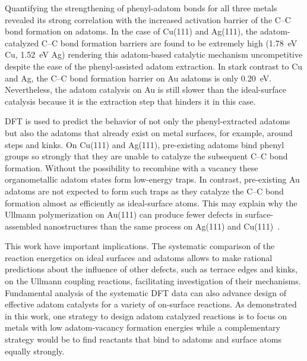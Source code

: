 \documentclass[aps,prb,amsmath,amssymb,11pt]{revtex4-1}
\newcommand{\zhzh}{\color{black}}
\renewcommand{\sout}[1]{\unskip}
\begin{document}
Quantifying the strengthening of phenyl-adatom bonds for all three metals revealed its strong correlation with the increased activation barrier of the C--C bond formation on adatoms. In the case of Cu(111) and Ag(111), the adatom-catalyzed C--C bond formation barriers are found to be extremely high (\SI{1.78}{\electronvolt} Cu, \SI{1.52}{\electronvolt} Ag) rendering this adatom-based catalytic mechanism \sout{impossible} {\zhzh uncompetitive} despite the ease of the phenyl-assisted adatom extraction. 
In stark contrast to Cu and Ag, the C--C bond formation barrier on Au adatoms is only \SI{0.20}{\electronvolt}. Nevertheless, the adatom catalysis on Au is still slower than the ideal-surface catalysis because it is the extraction step that hinders it in this case.

DFT is used to predict the behavior of not only the phenyl-extracted adatoms but also the adatoms that already exist on metal surfaces, for example, around steps and kinks. On Cu(111) and Ag(111), pre-existing adatoms bind phenyl groups so strongly that they are unable to catalyze the subsequent C--C bond formation. Without the possibility to recombine with a vacancy these organometallic adatom states form low-energy traps. In contrast, pre-existing Au adatoms are not expected to form such traps as they catalyze the C--C bond formation almost as efficiently as ideal-surface atoms. This \sout{implies that} {\zhzh may explain why} the Ullmann polymerization on Au(111) can produce fewer defects in surface-assembled nanostructures than the same process on Ag(111) and Cu(111)~\cite{ullmann_65}.

This work have important implications. The systematic comparison of the reaction energetics on ideal surfaces and adatoms allows to make rational predictions about the influence of other defects, such as terrace edges and kinks, on the Ullmann coupling reactions, facilitating investigation of their mechanisms.
Fundamental analysis of the systematic DFT data can also advance design of effective adatom catalysts for a variety of on-surface reactions. As demonstrated in this work, one strategy to design adatom catalyzed reactions is to focus on metals with low adatom-vacancy formation energies while a complementary strategy would be to find reactants that bind to adatoms and surface atoms equally strongly. 
\end{document}

